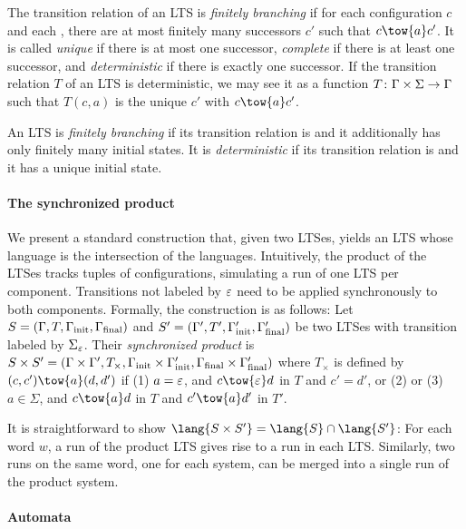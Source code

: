 \documentclass[../../diss.tex]{subfiles}
\begin{document}
The transition relation of an LTS is \emph{finitely branching} if for each configuration $c$ and each , there are at most finitely many successors $c'$ such that $c \tow{a} c'$.
It is called \emph{unique} if there is at most one successor, \emph{complete} if there is at least one successor, and \emph{deterministic} if there is exactly one successor.
If the transition relation $T$ of an LTS is deterministic, we may see it as a function $T \colon \Gamma \times \Sigma \to \Gamma$ such that $T(c,a)$ is the unique $c'$ with $c \tow{a} c'$.

An LTS is \emph{finitely branching} if its transition relation is and it additionally has only finitely many initial states.
It is \emph{deterministic} if its transition relation is and it has a unique initial state.

\paragraph{The synchronized product}

We present a standard construction that, given two LTSes, yields an LTS whose language is the intersection of the languages.
Intuitively, the product of the LTSes tracks tuples of configurations, simulating a run of one LTS per component.
Transitions not labeled by $\varepsilon$ need to be applied synchronously to both components.
Formally, the construction is as follows:
Let $S = (\Gamma,T,\Gamma_{\text{init}},\Gamma_{\text{final}})$ and $S' = (\Gamma',T',\Gamma_{\text{init}}',\Gamma_{\text{final}}')$ be two LTSes with transition labeled by $\Sigma_\varepsilon$.
Their \emph{synchronized product} is $S \times S' = (\Gamma \times \Gamma', T_\times, \Gamma_{\text{init}} \times \Gamma_{\text{init}}', \Gamma_{\text{final}} \times \Gamma_{\text{final}}')$ where $T_\times$ is defined by $(c,c') \tow{a} (d,d')$ if
(1) $a = \varepsilon$, and $c \tow{\eps} d$ in $T$ and $c' = d'$,
or
(2) 
or
(3) $a \in \Sigma$, and $c \tow{a} d$ in $T$ and $c' \tow{a} d'$ in $T'$.

It is straightforward to show $\lang{\lts \times \lts'} = \lang{\lts} \cap \lang{\lts'}$: For each word $w$, a run of the product LTS gives rise to a run in each LTS.\@
Similarly, two runs on the same word, one for each system, can be merged into a single run of the product system.


\paragraph{Automata}
\end{document}
